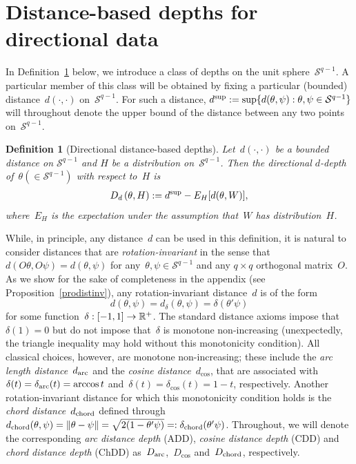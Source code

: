 \documentclass[usenames,dvipsnames]{article}
\newtheorem{mdef}{Definition}
\begin{document}

\section{Distance-based depths for directional data}
\label{secdef}

\noindent In Definition~\ref{defclass} below, we introduce a class of depths on the unit sphere~$\mathcal{S}^{q-1}$. A particular member of this class will be obtained by fixing a particular (bounded) distance~$d(\cdot,\cdot)$ on~$\mathcal{S}^{q-1}$. For such a distance, $d^{\rm sup}:=\sup \{ d(\theta, \psi): \theta,\psi\in \mathcal{S}^{q-1}\}$ will throughout denote the upper bound of the distance between any two points on~$\mathcal{S}^{q-1}$.   

\vspace{-.3cm}
\begin{mdef}[Directional distance-based depths] 
\label{defclass}
Let~$d(\cdot,\cdot)$ be a bounded distance on $\mathcal{S}^{q-1}$ and $H$ be a distribution on~$\mathcal{S}^{q-1}$. Then the 
\emph{directional $d$-depth of~$\theta(\in \mathcal{S}^{q-1})$ with respect to~$H$} is
\begin{align}
\label{eq:class}
D_{d}\left(\theta, H\right) 
:= 
d^{\rm sup} 
- 
E_H[d(\theta, W)]
,	
\end{align}
where~$E_H$ is the expectation under the assumption that~$W$ has distribution~$H$.
\end{mdef}
\vspace{-.3cm}
While, in principle, any distance~$d$ can be used in this definition, it is natural to consider distances that are \emph{rotation-invariant} in the sense that~$d(O\theta,O\psi)=d(\theta,\psi)$ for any~$\theta,\psi\in\mathcal{S}^{q-1}$ and any $q\times q$ orthogonal matrix~$O$. As we show for the sake of completeness in the appendix (see Proposition~\ref{prodistinv}), any rotation-invariant distance~$d$ is of the form
$$
d(\theta,\psi)=d_{\delta}(\theta,\psi)=\delta(\theta'\psi)
$$ 
for some function~$\delta:[-1,1]\to\mathbb{R}^+$. The standard distance axioms impose that~$\delta(1)=0$ but do not impose that~$\delta$ is monotone non-increasing (unexpectedly, the triangle inequality may hold without this monotonicity condition). All classical choices, however, are monotone non-increasing; these include the \emph{arc length distance}~$d_{\rm arc}$ and the \emph{cosine distance}~$d_{\cos}$, that are associated with~$\delta(t)=\delta_{\rm arc}(t)=\arccos t$ and~$\delta(t)=\delta_{\cos}(t)=1-t$, respectively. Another rotation-invariant distance for which this monotonicity condition holds is the \emph{chord distance}~$d_{\rm chord}$ defined through~$d_{\rm chord}(\theta,\psi)=\|\theta-\psi\|=\sqrt{2(1-\theta'\psi)}
\linebreak =:\delta_{\rm chord}(\theta'\psi)$. Throughout, we will denote the corresponding \emph{arc distance depth} (ADD), \emph{cosine distance depth} (CDD) and \emph{chord distance depth} (ChDD) as~$D_{\rm arc}$,~$D_{\cos}$ and~$D_{\rm chord}$, respectively.  
\end{document}
